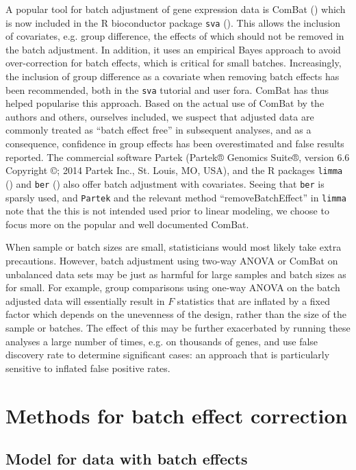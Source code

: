 \documentclass[oupdraft]{bio}
\begin{document}
A popular tool for batch adjustment of gene expression data is ComBat (\citealp{Johnson2007}) which is now included in the R bioconductor package \texttt{sva} (\citealp{Leek2012}). This allows the inclusion of covariates, e.g. group difference, the effects of which should not be removed in the batch adjustment. In addition, it uses an empirical Bayes approach to avoid over-correction for batch effects, which is critical for small batches. Increasingly, the inclusion of group difference as a covariate when removing batch effects has been recommended, both in the \texttt{sva} tutorial and user fora. ComBat has thus helped popularise this approach. Based on the actual use of ComBat by the authors and others, ourselves included, we suspect that adjusted data are commonly treated as ``batch effect free'' in subsequent analyses, and as a consequence, confidence in group effects has been overestimated and false results reported. The commercial software Partek (Partek® Genomics Suite®, version 6.6 Copyright ©; 2014 Partek Inc., St. Louis, MO, USA), and the R packages \texttt{limma} (\citealp{Smyth2003}) and \texttt{ber} (\citealp{http://link.springer.com/article/10.1007/s12561-013-9081-1}) also offer batch adjustment with covariates. Seeing that \texttt{ber} is sparsly used, and \texttt{Partek} and the relevant method ``removeBatchEffect'' in \texttt{limma} note that the this is not intended used prior to linear modeling, we choose to focus more on the popular and well documented ComBat.


When sample or batch sizes are small, statisticians would most likely take extra precautions. However, batch adjustment using two-way ANOVA or ComBat on unbalanced data sets may be just as harmful for large samples and batch sizes as for small. For example, group comparisons using one-way ANOVA on the batch adjusted data will essentially result in $F$ statistics that are inflated by a fixed factor which depends on the unevenness of the design, rather than the size of the sample or batches. The effect of this may be further exacerbated by running these analyses a large number of times, e.g. on thousands of genes, and use false discovery rate to determine significant cases: an approach that is particularly sensitive to inflated false positive rates.


\section{Methods for batch effect correction}

\subsection{Model for data with batch effects}
\end{document}
